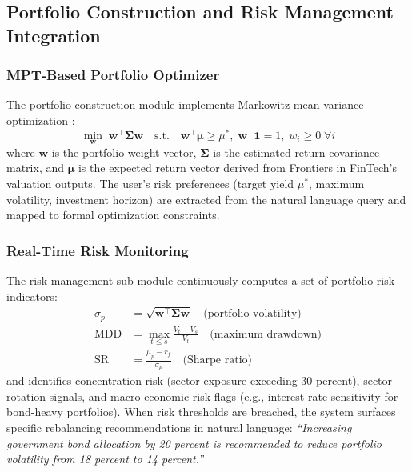 \documentclass[12pt,letterpaper]{article}
\begin{document}
\subsection{Portfolio Construction and Risk Management Integration}

\subsubsection{MPT-Based Portfolio Optimizer}

The portfolio construction module implements Markowitz mean-variance
optimization \citep{markowitz1952}:
\begin{equation}
  \min_{\mathbf{w}} \; \mathbf{w}^\top \boldsymbol{\Sigma} \mathbf{w}
  \quad \text{s.t.} \quad
  \mathbf{w}^\top \boldsymbol{\mu} \geq \mu^*,\;
  \mathbf{w}^\top \mathbf{1} = 1,\;
  w_i \geq 0 \;\forall i
  \label{eq:mpt}
\end{equation}
where $\mathbf{w}$ is the portfolio weight vector,
$\boldsymbol{\Sigma}$ is the estimated return covariance matrix,
and $\boldsymbol{\mu}$ is the expected return vector derived from
Frontiers in FinTech's valuation outputs.
The user's risk preferences (target yield $\mu^*$, maximum volatility,
investment horizon) are extracted from the natural language query and
mapped to formal optimization constraints.

\subsubsection{Real-Time Risk Monitoring}

The risk management sub-module continuously computes a set of portfolio
risk indicators:
\begin{align}
  \sigma_p &= \sqrt{\mathbf{w}^\top \boldsymbol{\Sigma} \mathbf{w}}
    \quad\text{(portfolio volatility)} \nonumber\\
  \text{MDD} &= \max_{t \leq s} \frac{V_t - V_s}{V_t}
    \quad\text{(maximum drawdown)} \nonumber\\
  \text{SR} &= \frac{\mu_p - r_f}{\sigma_p}
    \quad\text{(Sharpe ratio)} \label{eq:risk}
\end{align}
and identifies concentration risk (sector exposure exceeding
30 percent), sector rotation signals, and macro-economic risk flags
(e.g., interest rate sensitivity for bond-heavy portfolios).
When risk thresholds are breached, the system surfaces specific
rebalancing recommendations in natural language: \textit{``Increasing
government bond allocation by 20 percent is recommended to reduce
portfolio volatility from 18 percent to 14 percent.''}
\end{document}
